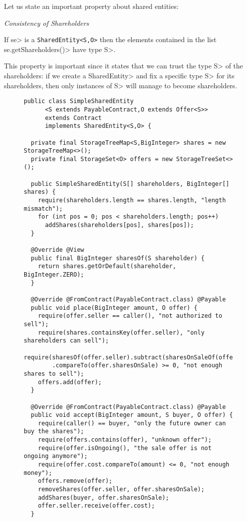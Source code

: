 Let us state an important property about shared entities:

\begin{tcolorbox}
  \begin{center}\emph{Consistency of Shareholders}\end{center}
  If \<se> is a {\codesize\texttt{SharedEntity<S,O>}}
  then the elements contained in the list \<se.getShareholders()> have type \<S>.
\end{tcolorbox}

\noindent
This property is important since it states that we can trust the type \<S> of
the shareholders: if we create a \<SharedEntity> and fix a specific type \<S>
for its shareholders, then only instances of \<S> will manage to become shareholders.

\begin{figure}[htbp]
  \begin{center}
    \begin{lstlisting}[language=Takamaka]
public class SimpleSharedEntity
      <S extends PayableContract,O extends Offer<S>>
      extends Contract
      implements SharedEntity<S,O> {

  private final StorageTreeMap<S,BigInteger> shares = new StorageTreeMap<>();
  private final StorageSet<O> offers = new StorageTreeSet<>();        

  public SimpleSharedEntity(S[] shareholders, BigInteger[] shares) {
    require(shareholders.length == shares.length, "length mismatch");
    for (int pos = 0; pos < shareholders.length; pos++)
      addShares(shareholders[pos], shares[pos]);
  }

  @Override @View
  public final BigInteger sharesOf(S shareholder) {
    return shares.getOrDefault(shareholder, BigInteger.ZERO);
  }

  @Override @FromContract(PayableContract.class) @Payable
  public void place(BigInteger amount, O offer) {
    require(offer.seller == caller(), "not authorized to sell");
    require(shares.containsKey(offer.seller), "only shareholders can sell");
    require(sharesOf(offer.seller).subtract(sharesOnSaleOf(offer.seller))
        .compareTo(offer.sharesOnSale) >= 0, "not enough shares to sell");
    offers.add(offer);
  }

  @Override @FromContract(PayableContract.class) @Payable
  public void accept(BigInteger amount, S buyer, O offer) {
    require(caller() == buyer, "only the future owner can buy the shares");
    require(offers.contains(offer), "unknown offer");
    require(offer.isOngoing(), "the sale offer is not ongoing anymore");
    require(offer.cost.compareTo(amount) <= 0, "not enough money");
    offers.remove(offer);
    removeShares(offer.seller, offer.sharesOnSale);
    addShares(buyer, offer.sharesOnSale);
    offer.seller.receive(offer.cost);
  }


\end{lstlisting}
\end{center}
\end{figure}
